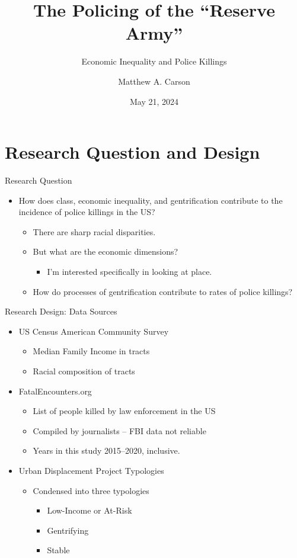 \documentclass{beamer}
\title{The Policing of the “Reserve Army”}
\subtitle{Economic Inequality and Police Killings}
\author{Matthew A. Carson}\date{May 21, 2024}
\begin{document}
\begin{frame}
  \titlepage
\end{frame}

\section{Research Question and Design}
\begin{frame}{Research Question}
	\begin{itemize}
		\item How does class, economic inequality, and gentrification contribute to the incidence of police killings in the US? \pause
		\begin{itemize}
			\item There are sharp racial disparities.
			\item But what are the economic dimensions? \pause
			\begin{itemize}
				\item I'm interested specifically in looking at place. \pause
			\end{itemize}
			\item How do processes of gentrification contribute to rates of police killings?
		\end{itemize}		
	\end{itemize}
\end{frame}

\begin{frame}{Research Design: Data Sources}
	\begin{itemize}
	\item US Census American Community Survey
		\begin{itemize}
			\item Median Family Income in tracts
			\item Racial composition of tracts
		\end{itemize} \pause
	\item FatalEncounters.org
		\begin{itemize}
			\item List of people killed by law enforcement in the US
			\item Compiled by journalists -- FBI data not reliable
			\item Years in this study 2015--2020, inclusive.
		\end{itemize} \pause
	\item Urban Displacement Project Typologies \nocite{udpDisplacementGentrificationTypologies2023}
		\begin{itemize}
			\item Condensed into three typologies
			\begin{itemize}
				\item Low-Income or At-Risk
				\item Gentrifying
				\item Stable
			\end{itemize}
		\end{itemize}
	\end{itemize}
\end{frame}
\end{document}
